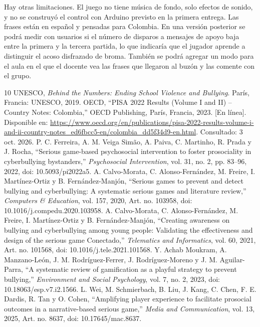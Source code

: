 \documentclass[conference]{IEEEtran}
\begin{document}
Hay otras limitaciones. El juego no tiene música de fondo, solo efectos de sonido, y no se construyó el control con Arduino previsto en la primera entrega. Las frases están en español y pensadas para Colombia. En una versión posterior se podrá medir con usuarios si el número de disparos a mensajes de apoyo baja entre la primera y la tercera partida, lo que indicaría que el jugador aprende a distinguir el acoso disfrazado de broma. También se podrá agregar un modo para el aula en el que el docente vea las frases que llegaron al buzón y las comente con el grupo.

\FloatBarrier

\begin{thebibliography}{10}
 UNESCO, \textit{Behind the Numbers: Ending School Violence and Bullying}. París, Francia: UNESCO, 2019.
 OECD, ``PISA 2022 Results (Volume I and II) -- Country Notes: Colombia,'' OECD Publishing, París, Francia, 2023. [En línea]. Disponible en: \url{https://www.oecd.org/en/publications/pisa-2022-results-volume-i-and-ii-country-notes_ed6fbcc5-en/colombia_dd5f34d9-en.html}. Consultado: 3 oct. 2026.
 P. C. Ferreira, A. M. Veiga Simão, A. Paiva, C. Martinho, R. Prada y J. Rocha, ``Serious game-based psychosocial intervention to foster prosociality in cyberbullying bystanders,'' \textit{Psychosocial Intervention}, vol. 31, no. 2, pp. 83--96, 2022, doi: 10.5093/pi2022a5.
 A. Calvo-Morata, C. Alonso-Fernández, M. Freire, I. Martínez-Ortiz y B. Fernández-Manjón, ``Serious games to prevent and detect bullying and cyberbullying: A systematic serious games and literature review,'' \textit{Computers \& Education}, vol. 157, 2020, Art. no. 103958, doi: 10.1016/j.compedu.2020.103958.
 A. Calvo-Morata, C. Alonso-Fernández, M. Freire, I. Martínez-Ortiz y B. Fernández-Manjón, ``Creating awareness on bullying and cyberbullying among young people: Validating the effectiveness and design of the serious game Conectado,'' \textit{Telematics and Informatics}, vol. 60, 2021, Art. no. 101568, doi: 10.1016/j.tele.2021.101568.
 Y. Achab Moukram, A. Manzano-León, J. M. Rodríguez-Ferrer, J. Rodríguez-Moreno y J. M. Aguilar-Parra, ``A systematic review of gamification as a playful strategy to prevent bullying,'' \textit{Environment and Social Psychology}, vol. 7, no. 2, 2023, doi: 10.18063/esp.v7.i2.1566.
 L. Wei, M. Schmierbach, B. Liu, J. Kang, C. Chen, F. E. Dardis, R. Tan y O. Cohen, ``Amplifying player experience to facilitate prosocial outcomes in a narrative-based serious game,'' \textit{Media and Communication}, vol. 13, 2025, Art. no. 8637, doi: 10.17645/mac.8637.

\end{thebibliography}
\end{document}
